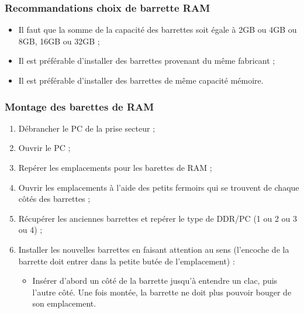 \documentclass[12pt]{article}
\begin{document}
        \subsubsection{Recommandations choix de barrette RAM}
            \begin{itemize}
                \item Il faut que la somme de la capacité des barrettes soit égale à 2GB ou 4GB ou 8GB, 16GB ou 32GB ;
                \item Il est préférable d’installer des barrettes provenant du même fabricant ;
                \item Il est préférable d’installer des barrettes de même capacité mémoire.
            \end{itemize}
        \subsubsection{Montage des barettes de RAM}
            \begin{enumerate}
                \item Débrancher le PC de la prise secteur ;
                \item Ouvrir le PC ;
                \item Repérer les emplacements pour les barettes de RAM ;
                \item Ouvrir les emplacements à l’aide des petits fermoirs qui se trouvent de chaque côtés des barrettes ;
                \item Récupérer les anciennes barrettes et repérer le type de DDR/PC (1 ou 2 ou 3 ou 4) ;
                \item Installer les nouvelles barrettes en faisant attention au sens (l’encoche de la barrette doit entrer dans la petite butée de l’emplacement) :
                \begin{itemize}
                    \item Insérer d’abord un côté de la barrette jusqu’à entendre un clac, puis l’autre côté. Une fois montée, la barrette ne doit plus pouvoir bouger de son emplacement.
                \end{itemize}
            \end{enumerate}
\end{document}
